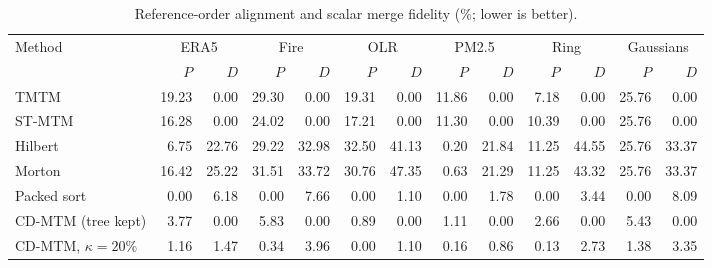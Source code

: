 \begin{table}[t]
\caption{Reference-order alignment and scalar merge fidelity (\%; lower is better).}\label{tab:tradeoff}
\centering\footnotesize
\setlength{\tabcolsep}{3pt}
\begin{tabular}{lrrrrrrrrrrrr}\toprule
Method & \multicolumn{2}{c}{ERA5} & \multicolumn{2}{c}{Fire} & \multicolumn{2}{c}{OLR} & \multicolumn{2}{c}{PM2.5} & \multicolumn{2}{c}{Ring} & \multicolumn{2}{c}{Gaussians}\\\cmidrule(lr){2-3}\cmidrule(lr){4-5}\cmidrule(lr){6-7}\cmidrule(lr){8-9}\cmidrule(lr){10-11}\cmidrule(lr){12-13} & $P$ & $D$ & $P$ & $D$ & $P$ & $D$ & $P$ & $D$ & $P$ & $D$ & $P$ & $D$\\\midrule
TMTM & 19.23 & 0.00 & 29.30 & 0.00 & 19.31 & 0.00 & 11.86 & 0.00 & 7.18 & 0.00 & 25.76 & 0.00\\
ST-MTM & 16.28 & 0.00 & 24.02 & 0.00 & 17.21 & 0.00 & 11.30 & 0.00 & 10.39 & 0.00 & 25.76 & 0.00\\
Hilbert & 6.75 & 22.76 & 29.22 & 32.98 & 32.50 & 41.13 & 0.20 & 21.84 & 11.25 & 44.55 & 25.76 & 33.37\\
Morton & 16.42 & 25.22 & 31.51 & 33.72 & 30.76 & 47.35 & 0.63 & 21.29 & 11.25 & 43.32 & 25.76 & 33.37\\
Packed sort & 0.00 & 6.18 & 0.00 & 7.66 & 0.00 & 1.10 & 0.00 & 1.78 & 0.00 & 3.44 & 0.00 & 8.09\\
CD-MTM (tree kept) & 3.77 & 0.00 & 5.83 & 0.00 & 0.89 & 0.00 & 1.11 & 0.00 & 2.66 & 0.00 & 5.43 & 0.00\\
CD-MTM, $\kappa=20\%$ & 1.16 & 1.47 & 0.34 & 3.96 & 0.00 & 1.10 & 0.16 & 0.86 & 0.13 & 2.73 & 1.38 & 3.35\\
\bottomrule\end{tabular}
\par{}
\end{table}
